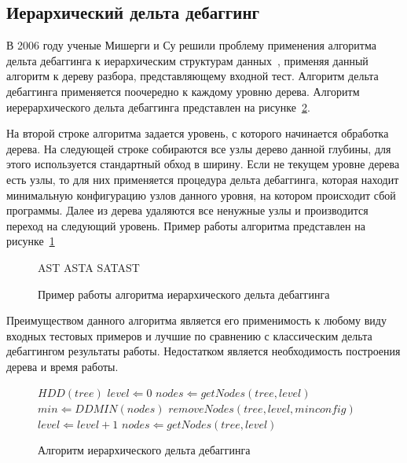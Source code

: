 \subsection{Иерархический дельта дебаггинг}
В 2006 году ученые Мишерги и Су решили проблему применения алгоритма дельта дебаггинга к иерархическим структурам данных~\cite{misherghi2006hdd}, применяя данный алгоритм к дереву разбора, представляющему входной тест. Алгоритм дельта дебаггинга применяется поочередно к каждому уровню дерева. Алгоритм иерерархического дельта дебаггинга представлен на рисунке~\ref{alg:hdd}. 

На второй строке алгоритма задается уровень, с которого начинается обработка дерева. На следующей строке собираются все узлы дерево данной глубины, для этого используется стандартный обход в ширину. Если не текущем уровне дерева есть узлы, то для них применяется процедура дельта дебаггинга, которая находит минимальную конфигурацию узлов данного уровня, на котором происходит сбой программы. Далее из дерева удаляются все ненужные узлы и производится переход на следующий уровень. Пример работы алгоритма представлен на рисунке~\ref{ex:hdd}
\begin{figure}[h]
AST ASTA SATAST
\caption{Пример работы алгоритма иерархического дельта дебаггинга}
\label{ex:hdd}
\end{figure}

Преимуществом данного алгоритма является его применимость к любому виду входных тестовых примеров и лучшие по сравнению с классическим дельта дебаггингом результаты работы. Недостатком является необходимость построения дерева и время работы.
\begin{figure}[h]
\begin{algorithmic}[1]
\STATE $HDD(tree)$
\STATE $level \Leftarrow 0$
\STATE $nodes \Leftarrow getNodes(tree, level)$
	\STATE $min \Leftarrow DDMIN(nodes)$
	\STATE $removeNodes(tree, level, minconfig)$
	\STATE $level \Leftarrow level + 1$
	\STATE $nodes \Leftarrow getNodes(tree, level)$
\ENDWHILE
\end{algorithmic}
\caption{Алгоритм иерархического дельта дебаггинга}
\label{alg:hdd}
\end{figure}



